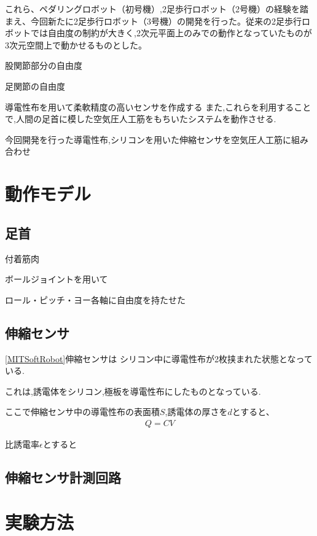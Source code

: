 これら、ペダリングロボット（初号機）,2足歩行ロボット（2号機）の経験を踏まえ、今回新たに2足歩行ロボット（3号機）の開発を行った。従来の2足歩行ロボットでは自由度の制約が大きく,2次元平面上のみでの動作となっていたものが3次元空間上で動かせるものとした。

股関節部分の自由度

足関節の自由度

導電性布を用いて柔軟精度の高いセンサを作成する
また,これらを利用することで,人間の足首に模した空気圧人工筋をもちいたシステムを動作させる.

今回開発を行った導電性布,シリコンを用いた伸縮センサを空気圧人工筋に組み合わせ
\section{動作モデル}
\subsection{足首}
付着筋肉

ボールジョイントを用いて

ロール・ピッチ・ヨー各軸に自由度を持たせた
\subsection{伸縮センサ}
\ref{MITSoftRobot}伸縮センサは
シリコン中に導電性布が2枚挟まれた状態となっている.

これは,誘電体をシリコン,極板を導電性布にしたものとなっている.

ここで伸縮センサ中の導電性布の表面積$S$,誘電体の厚さを$d$とすると、
\begin{eqnarray}
    Q=CV
\end{eqnarray}

比誘電率$\epsilon$とすると

\subsection{伸縮センサ計測回路}
\section{実験方法}

